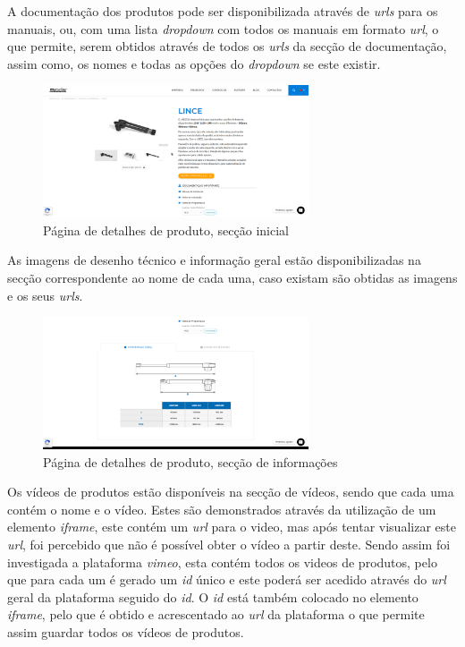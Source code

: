 A documentação dos produtos pode ser disponibilizada através de \textit{urls} para os manuais, ou, com uma lista \textit{dropdown} com todos os manuais em formato \textit{url}, o que permite, serem obtidos através de todos os \textit{urls} da secção de documentação, assim como, os nomes e todas as opções do \textit{dropdown} se este existir.

\begin{figure}[htb]
    \centering
    
    \includegraphics[width=0.7\textwidth]{images/implementacao/scraper/pagina_detalhes_produto.png}
    \caption{Página de detalhes de produto, secção inicial}
    \label{fig:53}
\end{figure}

\newpage

As imagens de desenho técnico e informação geral estão disponibilizadas na secção correspondente
ao nome de cada uma, caso existam são obtidas as imagens e os seus \textit{urls}.

\begin{figure}[htb]
    \centering
    
    \includegraphics[width=0.7\textwidth]{images/implementacao/scraper/pagina_detalhes_desenhos.png}
    \caption{Página de detalhes de produto, secção de informações}
    \label{fig:54}
\end{figure}

Os vídeos de produtos estão disponíveis na secção de vídeos, sendo que cada uma contém o nome e o vídeo.
Estes são demonstrados através da utilização de um elemento \textit{iframe}, este contém um \textit{url} para o video, mas após tentar visualizar este \textit{url}, foi percebido que não é possível obter o vídeo a partir deste. Sendo assim foi investigada a plataforma \textit{vimeo}, esta contém todos os videos de produtos, pelo que para cada um é gerado um \textit{id} único e este poderá ser acedido através do \textit{url} geral da plataforma seguido 
do \textit{id}. O \textit{id} está também colocado no elemento \textit{iframe}, pelo que é obtido e acrescentado ao \textit{url} da plataforma o que permite assim guardar todos os vídeos de produtos.

